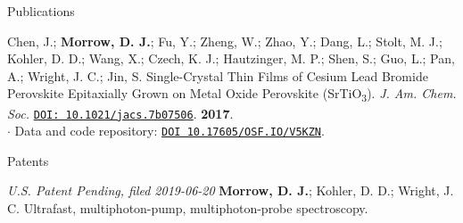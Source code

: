 \documentclass{resume} %
\begin{document}
\begin{rSection}{Publications}
\begin{etaremune}
\item Chen, J.; \textbf{Morrow, D. J.}; Fu, Y.; Zheng, W.; Zhao, Y.; Dang, L.; Stolt, M. J.; Kohler, D. D.; Wang, X.; Czech, K. J.; Hautzinger, M. P.; Shen, S.; Guo, L.; Pan, A.; Wright, J. C.; Jin, S. Single-Crystal Thin Films of Cesium Lead Bromide Perovskite Epitaxially Grown on Metal Oxide Perovskite (SrTiO\textsubscript{3}). \emph{J. Am. Chem. Soc.} \href{http://pubs.acs.org/doi/10.1021/jacs.7b07506}{\texttt{DOI: 10.1021/jacs.7b07506}}. \textbf{2017}. \\
$\cdot$ Data and code repository: \href{https://osf.io/v5kzn/}{\texttt{DOI 10.17605/OSF.IO/V5KZN}}.
	


\pagebreak
\end{etaremune}


\end{rSection}

\begin{rSection}{Patents}
	\begin{etaremune}
		\item[] \textit{U.S. Patent Pending, filed 2019-06-20} \textbf{Morrow, D. J.}; Kohler, D. D.; Wright, J. C. Ultrafast, multiphoton-pump, multiphoton-probe spectroscopy. 		
	\end{etaremune}	
\end{rSection}
\end{document}
